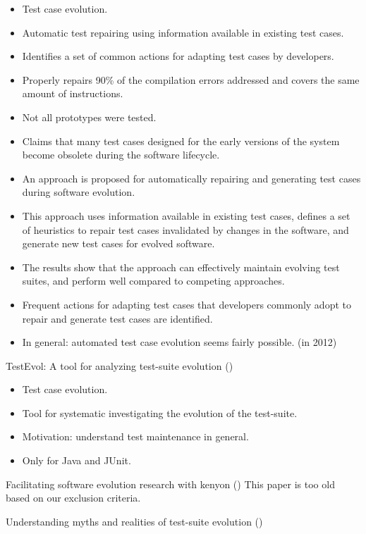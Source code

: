 \documentclass[]{book}
\providecommand{\tightlist}{%
  \setlength{\itemsep}{0pt}\setlength{\parskip}{0pt}}
\begin{document}
\begin{itemize}
\tightlist
\item
  Test case evolution.
\item
  Automatic test repairing using information available in existing test
  cases.
\item
  Identifies a set of common actions for adapting test cases by
  developers.
\item
  Properly repairs 90\% of the compilation errors addressed and covers
  the same amount of instructions.
\item
  Not all prototypes were tested.
\item
  Claims that many test cases designed for the early versions of the
  system become obsolete during the software lifecycle.
\item
  An approach is proposed for automatically repairing and generating
  test cases during software evolution.
\item
  This approach uses information available in existing test cases,
  defines a set of heuristics to repair test cases invalidated by
  changes in the software, and generate new test cases for evolved
  software.
\item
  The results show that the approach can effectively maintain evolving
  test suites, and perform well compared to competing approaches.
\item
  Frequent actions for adapting test cases that developers commonly
  adopt to repair and generate test cases are identified.
\item
  In general: automated test case evolution seems fairly possible. (in
  2012)
\end{itemize}

TestEvol: A tool for analyzing test-suite evolution (\citet{pinto2013})

\begin{itemize}
\tightlist
\item
  Test case evolution.
\item
  Tool for systematic investigating the evolution of the test-suite.
\item
  Motivation: understand test maintenance in general.
\item
  Only for Java and JUnit.
\end{itemize}

Facilitating software evolution research with kenyon (\citet{bevan2005})
This paper is too old based on our exclusion criteria.

Understanding myths and realities of test-suite evolution
(\citet{pinto2012understanding})
\end{document}
